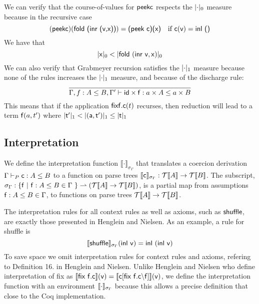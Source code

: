 We can verify that the course-of-values for $\mathsf{peek c}$ respects the $|\mathsf{\cdot}|_0$ measure because in the recursive case \[\mathsf{(peek c)}(\textsf{fold (inr (v,x))})=\textsf{(peek c)(x)}\quad \text{if }\mathsf{c}(\textsf{v})=\textsf{inl ()}\]
We have that 
\[ |\mathsf{x}|_0 < |\mathsf{fold~ (inr~ v,x)}|_0\]
We can also verify that Grabmeyer recursion satisfies the $|\mathsf{\cdot}|_1$ measure because none of the rules increases the $|\mathsf{\cdot}|_1$ measure, and because of the discharge rule:
\[\infer{\contains{\Gamma, f : A \leq B, \Gamma'}{id \times f}{a \times A}{a \times B}}{}\]
This means that if the application $\mathsf{fix f.c}(t)$ recurses, then reduction will lead to a term $\mathsf{f}(a,t')$ where $|\mathsf{t'}|_1 < |\mathsf{(a,t')}|_1\leq |\mathsf{t}|_1$\\
\subsection{Interpretation}
We define the interpretation function $\llbracket \cdot \rrbracket_{\sigma_{\Gamma}}$ that translates a coercion derivation $\Gamma \vdash_P \mathsf{c} : A \leq B$ to a function on parse trees $\llbracket \mathsf{c} \rrbracket_{\sigma_{\Gamma}} : \mathcal{T}\llbracket A \rrbracket  \rightarrow \mathcal{T}\llbracket B \rrbracket$. The subscript, $\sigma_{\Gamma} : \{ \mathsf{f} ~|~\mathsf{f} : A \leq B  \in \Gamma \ \} \rightharpoonup  (\mathcal{T}\llbracket A \rrbracket \rightarrow \mathcal{T}\llbracket B \rrbracket)$, is a partial map from assumptions $\mathsf{f} : A \leq B  \in \Gamma$, to functions on parse trees $\mathcal{T}\llbracket A \rrbracket \rightarrow \mathcal{T}\llbracket B \rrbracket$. 

The interpretation rules for all context rules as well as axioms, such as $\mathsf{shuffle}$, are exactly those presented in Henglein and Nielsen. As an example, a rule for shuffle is 
\[\llbracket \mathsf{shuffle} \rrbracket_{\sigma_{\Gamma}}(\mathsf{inl~v})=\mathsf{inl~(inl~v)} \]
To save space we omit interpretation rules for context rules and axioms, refering to Definition 16. in Henglein and Nielsen. Unlike Henglein and Nielsen who define interpretation of fix as $\llbracket \mathsf{fix} ~ \mathsf{f.c} \rrbracket(\mathsf{v})=\llbracket \mathsf{c}[\mathsf{fix}~\mathsf{f.c} \backslash \mathsf{f}] \rrbracket(\mathsf{v})$, we define the interpretation function with an environment $\llbracket \cdot \rrbracket_{\sigma_{\Gamma}}$ because this allows a precise definition that close to the Coq implementation.

